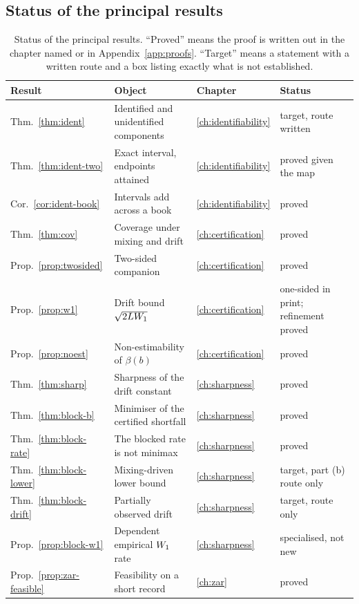 \documentclass[../../../main.tex]{subfiles}
\begin{document}
\subsection{Status of the principal results}

\begin{table}[htbp]\centering\small
\caption{Status of the principal results. ``Proved'' means the proof is written out in the chapter named or in Appendix~\ref{app:proofs}. ``Target'' means a statement with a written route and a box listing exactly what is not established.}\label{tab:intro-status}
\begin{tabular}{@{}llll@{}}
\toprule
Result & Object & Chapter & Status \\
\midrule
Thm.~\ref{thm:ident} & Identified and unidentified components & \ref{ch:identifiability} & target, route written \\
Thm.~\ref{thm:ident-two} & Exact interval, endpoints attained & \ref{ch:identifiability} & proved given the map \\
Cor.~\ref{cor:ident-book} & Intervals add across a book & \ref{ch:identifiability} & proved \\
Thm.~\ref{thm:cov} & Coverage under mixing and drift & \ref{ch:certification} & proved \\
Prop.~\ref{prop:twosided} & Two-sided companion & \ref{ch:certification} & proved \\
Prop.~\ref{prop:w1} & Drift bound $\sqrt{2LW_1}$ & \ref{ch:certification} & one-sided in print; refinement proved \\
Prop.~\ref{prop:noest} & Non-estimability of $\beta(b)$ & \ref{ch:certification} & proved \\
Thm.~\ref{thm:sharp} & Sharpness of the drift constant & \ref{ch:sharpness} & proved \\
Thm.~\ref{thm:block-b} & Minimiser of the certified shortfall & \ref{ch:sharpness} & proved \\
Thm.~\ref{thm:block-rate} & The blocked rate is not minimax & \ref{ch:sharpness} & proved \\
Thm.~\ref{thm:block-lower} & Mixing-driven lower bound & \ref{ch:sharpness} & target, part (b) route only \\
Thm.~\ref{thm:block-drift} & Partially observed drift & \ref{ch:sharpness} & target, route only \\
Prop.~\ref{prop:block-w1} & Dependent empirical $W_1$ rate & \ref{ch:sharpness} & specialised, not new \\
Prop.~\ref{prop:zar-feasible} & Feasibility on a short record & \ref{ch:zar} & proved \\
\bottomrule
\end{tabular}
\end{table}
\end{document}
